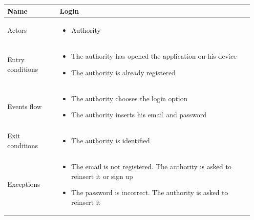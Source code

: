\documentclass[a4paper]{article}
\begin{document}
\begin{table}[H]
\centering
\begin{tabularx}{\textwidth}{|l|X|}
\hline
Name & Login\tabularnewline
\hline
Actors &
\begin{itemize}[nosep,leftmargin=*]
\item Authority
\end{itemize}
\tabularnewline
\hline
Entry conditions &
\begin{itemize}[nosep,leftmargin=*]
\item The authority has opened the application on his device
\item The authority is already registered
\end{itemize}
\tabularnewline
\hline
Events flow &
\begin{itemize}[nosep,leftmargin=*]
\item The authority chooses the login option
\item The authority inserts his email and password
\end{itemize}
\tabularnewline
\hline
Exit conditions &
\begin{itemize}[nosep,leftmargin=*]
\item The authority is identified
\end{itemize}
\tabularnewline
\hline
Exceptions &
\begin{itemize}[nosep,leftmargin=*]
\item The email is not registered. The authority is asked to reinsert it
or sign up
\item The password is incorrect. The authority is asked to reinsert it
\end{itemize}
\tabularnewline
\hline
\end{tabularx}
\end{table}
\end{document}
